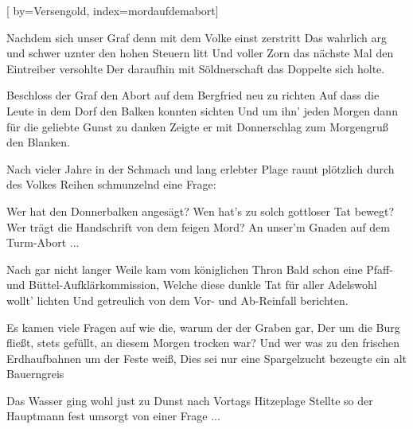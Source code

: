 
[%
    by={Versengold},
    index={mordaufdemabort}]


    \label{mordaufdemabort}

    \begin{center}
    \end{center}

    \beginverse
        Nachdem sich unser Graf denn mit dem Volke einst zerstritt
        Das wahrlich arg und schwer uznter den hohen Steuern litt
        Und voller Zorn das n\"{a}chste Mal den Eintreiber versohlte
        Der daraufhin mit S\"{o}ldnerschaft das Doppelte sich holte.

        Beschloss der Graf den Abort auf dem Bergfried neu zu richten
        Auf dass die Leute in dem Dorf den Balken konnten sichten
        Und um ihn' jeden Morgen dann f\"{u}r die geliebte Gunst zu danken
        Zeigte er mit Donnerschlag zum Morgengru\ss{} den Blanken.
    \endverse

    \beginverse*
        Nach vieler Jahre in der Schmach und lang erlebter Plage
        raunt pl\"{o}tzlich durch des Volkes Reihen schmunzelnd eine Frage:
    \endverse

    \beginchorus
        Wer hat den Donnerbalken anges\"{a}gt?
        Wen hat's zu solch gottloser Tat bewegt?
        Wer tr\"{a}gt die Handschrift von dem feigen Mord?
        An unser'm Gnaden auf dem Turm-Abort ...
    \endchorus

    \beginverse
        Nach gar nicht langer Weile kam vom k\"{o}niglichen Thron
        Bald schon eine Pfaff- und B\"{u}ttel-Aufkl\"{a}rkommission,
        Welche diese dunkle Tat f\"{u}r aller Adelswohl wollt' lichten
        Und getreulich von dem Vor- und Ab-Reinfall berichten.

        Es kamen viele Fragen auf wie die, warum der der Graben gar,
        Der um die Burg flie\ss{}t, stets gef\"{u}llt, an diesem Morgen trocken war?
        Und wer was zu den frischen Erdhaufbahnen um der Feste wei\ss{},
        Dies sei nur eine Spargelzucht bezeugte ein alt Bauerngreis
    \endverse

    \beginverse*
        Das Wasser ging wohl just zu Dunst nach Vortags Hitzeplage
        Stellte so der Hauptmann fest umsorgt von einer Frage ...
    \endverse

